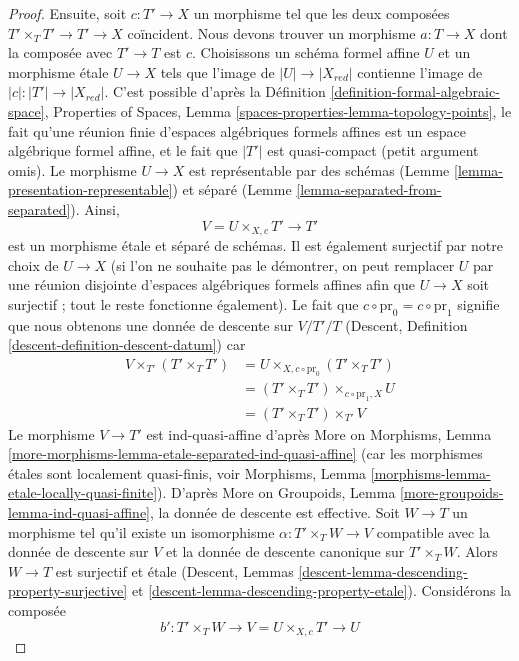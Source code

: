 \begin{proof}
\medskip\noindent
Ensuite, soit $c : T' \to X$ un morphisme tel que les deux composées
$T' \times_T T' \to T' \to X$ coïncident. Nous devons trouver un morphisme
$a : T \to X$ dont la composée avec $T' \to T$ est $c$. Choisissons un
schéma formel affine $U$ et un morphisme \'etale $U \to X$ tels que l'image
de $|U| \to |X_{red}|$ contienne l'image de $|c| : |T'| \to |X_{red}|$.
C'est possible d'après la
Définition \ref{definition-formal-algebraic-space},
Properties of Spaces, Lemma \ref{spaces-properties-lemma-topology-points},
le fait qu'une réunion finie d'espaces algébriques formels affines est un
espace algébrique formel affine, et le fait que $|T'|$ est quasi-compact
(petit argument omis). Le morphisme $U \to X$ est représentable
par des schémas (Lemme \ref{lemma-presentation-representable}) et
séparé (Lemme \ref{lemma-separated-from-separated}). Ainsi,
$$
V = U \times_{X, c} T' \longrightarrow T'
$$
est un morphisme \'etale et séparé de schémas. Il est également surjectif
par notre choix de $U \to X$ (si l'on ne souhaite pas le démontrer, on peut
remplacer $U$ par une réunion disjointe d'espaces algébriques formels affines afin que
$U \to X$ soit surjectif ; tout le reste fonctionne également). Le fait que
$c \circ \text{pr}_0 = c \circ \text{pr}_1$ signifie que nous obtenons une
donnée de descente sur $V/T'/T$
(Descent, Definition \ref{descent-definition-descent-datum})
car
\begin{align*}
V \times_{T'} (T' \times_T T')
& =
U \times_{X, c \circ \text{pr}_0} (T' \times_T T') \\
& =
(T' \times_T T') \times_{c \circ \text{pr}_1, X} U \\
& =
(T' \times_T T') \times_{T'} V
\end{align*}
Le morphisme $V \to T'$ est ind-quasi-affine d'après
More on Morphisms, Lemma
\ref{more-morphisms-lemma-etale-separated-ind-quasi-affine}
(car les morphismes \'etales sont localement quasi-finis, voir
Morphisms, Lemma \ref{morphisms-lemma-etale-locally-quasi-finite}).
D'après More on Groupoids, Lemma \ref{more-groupoids-lemma-ind-quasi-affine},
la donnée de descente est effective. Soit $W \to T$ un morphisme
tel qu'il existe un isomorphisme $\alpha : T' \times_T W \to V$
compatible avec la donnée de descente sur $V$ et la donnée de descente canonique
sur $T' \times_T W$. Alors $W \to T$ est surjectif et \'etale
(Descent, Lemmas \ref{descent-lemma-descending-property-surjective} et
\ref{descent-lemma-descending-property-etale}).
Considérons la composée
$$
b' : T' \times_T W \longrightarrow V = U \times_{X, c} T' \longrightarrow U
$$
\end{proof}
